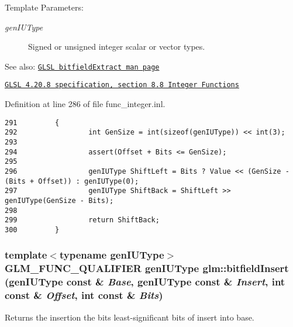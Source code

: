\begin{Desc}
\item[Template Parameters:]
\begin{description}
\item[{\em genIUType}]Signed or unsigned integer scalar or vector types.\end{description}
\end{Desc}
\begin{Desc}
\item[See also:]\href{http://www.opengl.org/sdk/docs/manglsl/xhtml/bitfieldExtract.xml}{\tt GLSL bitfieldExtract man page} 

\href{http://www.opengl.org/registry/doc/GLSLangSpec.4.20.8.pdf}{\tt GLSL 4.20.8 specification, section 8.8 Integer Functions} \end{Desc}


Definition at line 286 of file func\_\-integer.inl.

\begin{Code}\begin{verbatim}291         {
292                 int GenSize = int(sizeof(genIUType)) << int(3);
293 
294                 assert(Offset + Bits <= GenSize);
295 
296                 genIUType ShiftLeft = Bits ? Value << (GenSize - (Bits + Offset)) : genIUType(0);
297                 genIUType ShiftBack = ShiftLeft >> genIUType(GenSize - Bits);
298 
299                 return ShiftBack;
300         }
\end{verbatim}
\end{Code}


\hypertarget{group__core__func__integer_g33b112990d40ef4c8bf91591dc7d9cd9}{
\subsubsection[bitfieldInsert]{\setlength{\rightskip}{0pt plus 5cm}template$<$typename genIUType$>$ GLM\_\-FUNC\_\-QUALIFIER genIUType glm::bitfieldInsert (genIUType const \& {\em Base}, \/  genIUType const \& {\em Insert}, \/  int const \& {\em Offset}, \/  int const \& {\em Bits})}}
\label{group__core__func__integer_g33b112990d40ef4c8bf91591dc7d9cd9}


Returns the insertion the bits least-significant bits of insert into base.

